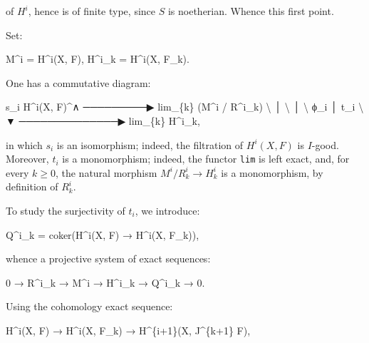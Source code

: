 \documentclass[
]{article}
\newenvironment{Shaded}{}{}
\newcommand{\NormalTok}[1]{#1}
\begin{document}
of \(H^{i}\), hence is of finite type, since \(S\) is noetherian. Whence
this first point.

Set:

\begin{Shaded}
\begin{Highlighting}[]
\NormalTok{M\^{}i = H\^{}i(X, F),    H\^{}i\_k = H\^{}i(X, F\_k).}
\end{Highlighting}
\end{Shaded}

One has a commutative diagram:

\begin{Shaded}
\begin{Highlighting}[]
\NormalTok{                     s\_i}
\NormalTok{   H\^{}i(X, F)\^{}∧  ─────────▶  lim\_\{k\} (M\^{}i / R\^{}i\_k)}
\NormalTok{        \textbackslash{}                         │}
\NormalTok{         \textbackslash{}                        │}
\NormalTok{          \textbackslash{} ϕ\_i                   │ t\_i}
\NormalTok{           \textbackslash{}                      ▼}
\NormalTok{            ──────────────▶  lim\_\{k\} H\^{}i\_k,}
\end{Highlighting}
\end{Shaded}

in which \(s_{i}\) is an isomorphism; indeed, the filtration of
\(H^{i}(X, F)\) is \(I\)-good. Moreover, \(t_{i}\) is a monomorphism;
indeed, the functor \texttt{lim} is left exact, and, for every
\(k \geqslant 0\), the natural morphism
\(M^{i} / R^{i}_{k} \to H^{i}_{k}\) is a monomorphism, by definition of
\(R^{i}_{k}\).

To study the surjectivity of \(t_{i}\), we introduce:

\begin{Shaded}
\begin{Highlighting}[]
\NormalTok{Q\^{}i\_k = coker(H\^{}i(X, F) → H\^{}i(X, F\_k)),}
\end{Highlighting}
\end{Shaded}

whence a projective system of exact sequences:

\begin{Shaded}
\begin{Highlighting}[]
\NormalTok{0 → R\^{}i\_k → M\^{}i → H\^{}i\_k → Q\^{}i\_k → 0.}
\end{Highlighting}
\end{Shaded}

Using the cohomology exact sequence:

\begin{Shaded}
\begin{Highlighting}[]
\NormalTok{H\^{}i(X, F) → H\^{}i(X, F\_k) → H\^{}\{i+1\}(X, J\^{}\{k+1\} F),}
\end{Highlighting}
\end{Shaded}
\end{document}
